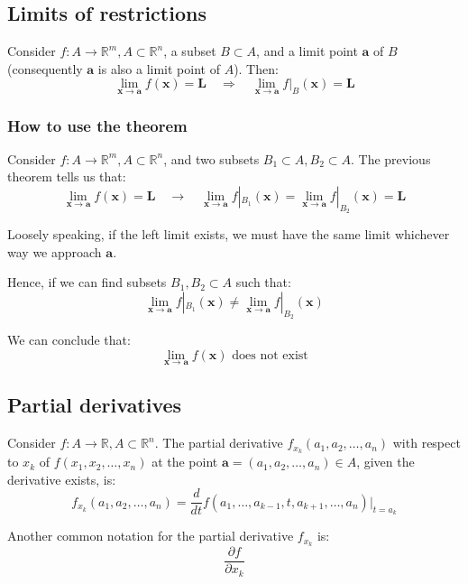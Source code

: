 \documentclass[11pt]{article}
\begin{document}
\newpage
\subsection{Limits of restrictions}
\label{sec:org83b03fd}
Consider \(f : A \rightarrow \mathbb{R}^m, A \subset \mathbb{R}^n\), a subset \(B \subset A\), and a limit point \(\boldsymbol{a}\) of \(B\) (consequently \(\boldsymbol{a}\) is also a limit point of \(A\)). Then:
\[\lim_{\boldsymbol{x} \rightarrow \boldsymbol{a}} f(\boldsymbol{x}) = \boldsymbol{L} \quad \Rightarrow \quad \lim_{\boldsymbol{x} \rightarrow \boldsymbol{a}} f|_B(\boldsymbol{x}) = \boldsymbol{L}\]
\subsubsection{How to use the theorem}
\label{sec:org4eab5f0}
Consider \(f : A \rightarrow \mathbb{R}^m, A \subset \mathbb{R}^n\), and two subsets \(B_1 \subset A, B_2 \subset A\). The previous theorem tells us that:
\[\lim_{\boldsymbol{x} \rightarrow \boldsymbol{a}} f(\boldsymbol{x}) = \boldsymbol{L} \quad \rightarrow \quad \lim_{\boldsymbol{x} \rightarrow \boldsymbol{a}} f|_{B_1} (\boldsymbol{x}) = \lim_{\boldsymbol{x} \rightarrow \boldsymbol{a}} f|_{B_2}(\boldsymbol{x}) = \boldsymbol{L}\]

Loosely speaking, if the left limit exists, we must have the same limit whichever way we approach \(\boldsymbol{a}\).


Hence, if we can find subsets \(B_1, B_2 \subset A\) such that:
\[\lim_{\boldsymbol{x} \rightarrow \boldsymbol{a}} f|_{B_1}(\boldsymbol{x}) \ne \lim_{\boldsymbol{x} \rightarrow \boldsymbol{a}} f|_{B_2} (\boldsymbol{x})\]

We can conclude that:
\[\lim_{\boldsymbol{x} \rightarrow \boldsymbol{a}} f(\boldsymbol{x}) \text{ does not exist}\]

\newpage
\subsection{Partial derivatives}
\label{sec:org6563583}
Consider \(f : A \rightarrow \mathbb{R}, A \subset \mathbb{R}^n\). The partial derivative \(f_{x_k} (a_1, a_2, \ldots, a_n)\) with respect to \(x_k\) of \(f(x_1, x_2, \ldots, x_n)\) at the point \(\boldsymbol{a} = (a_1, a_2, \ldots, a_n) \in A\), given the derivative exists, is:
\[f_{x_k}(a_1, a_2, \ldots, a_n) = \frac{d}{dt} f(a_1, \ldots, a_{k - 1}, t, a_{k + 1}, \ldots, a_n)|_{t = a_k}\]

Another common notation for the partial derivative \(f_{x_k}\) is:
\[\frac{\partial f}{\partial x_k}\]
\end{document}
